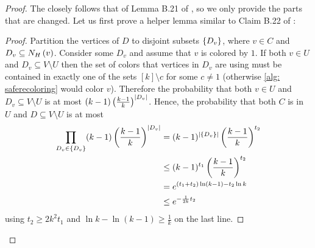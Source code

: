 \begin{proof}
    The closely follows that of Lemma B.21 of \cite{MR3536556-David16}, so we only provide the parts that are changed. Let us first prove a helper lemma similar to Claim B.22 of \cite{MR3536556-David16}:
    \begin{proof}
        Partition the vertices of $D$ to disjoint subsets $\left\{D_{v}\right\}$, where $v\in C$ and $D_{v}\subseteq N_{H}\left(v\right)$. Consider some $D_{v}$ and assume that $v$ is colored by $1$. If both $v\in U$ and $D_{v}\subseteq V\setminus U$ then the set of colors that vertices in $D_{v}$ are using must be contained in exactly one
        of the sets $[k]\setminus {c}$ for some $c\neq 1$ (otherwise \cref{alg: saferecoloring} would color $v$).
        Therefore the probability that both $v\in U$ and $D_{v}\subseteq V\setminus U$
        is at most $(k-1)\left(\frac{k-1}{k}\right)^{\left\lvert D_{v}\right\rvert}$. Hence, the probability that both $C$ is in $U$ and $D\subseteq V\setminus U$ is at most
        \begin{align*}
            \prod_{D_{v}\in\left\{ D_{v}\right\} }(k-1)\left(\frac{k-1}{k}\right)^{\left\lvert D_{v}\right\rvert} & =(k-1)^{\left\lvert\left\{ D_{v}\right\} \right\rvert}\left(\frac{k-1}{k}\right)^{t_2}\\
            & \le(k-1)^{t_1}\left(\frac{k-1}{k}\right)^{t_2}\\
            & =e^{(t_1+t_2)\ln(k-1)-t_2\ln{k}}\\
            & \le e^{-\frac{1}{2k}t_2}
        \end{align*}
        using $t_2\ge 2k^2t_1$ and $\ln{k}-\ln(k-1)\geq \frac{1}{k}$ on the last line.
    \end{proof}

\end{proof}
